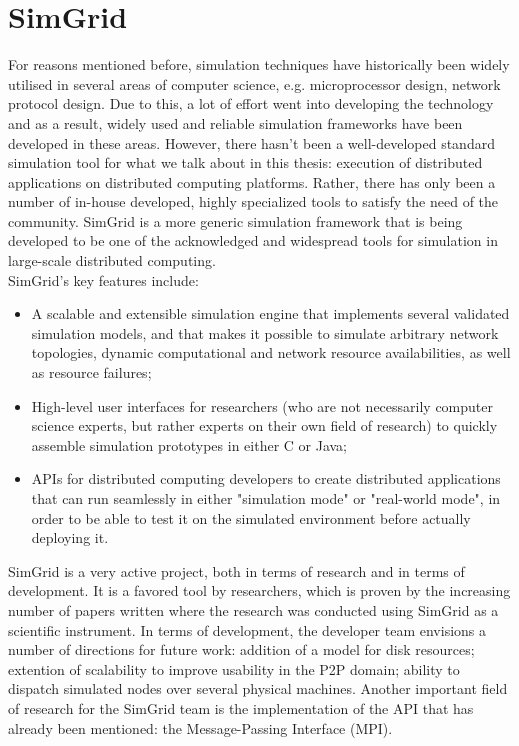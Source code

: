 \section{SimGrid}
For reasons mentioned before, simulation techniques have historically
been widely utilised in several areas of computer science,
e.g. microprocessor design, network protocol design. Due to this, a
lot of effort went into developing the technology and as a result,
widely used and reliable simulation frameworks have been developed in
these areas. However, there hasn't been a well-developed standard
simulation tool for what we talk about in this thesis: execution of
distributed applications on distributed computing platforms. Rather,
there has only been a number of in-house developed, highly specialized
tools to satisfy the need of the community. SimGrid is a more generic
simulation framework that is being developed to be one of the
acknowledged and widespread tools for simulation in large-scale
distributed computing.\cite{clq08}\\[0.3cm]
SimGrid's key features include:\cite{clq08}
\begin{itemize}
\item A scalable and extensible simulation engine that implements
  several validated simulation models, and that makes it possible to
  simulate arbitrary network topologies, dynamic computational and
  network resource availabilities, as well as resource failures;
\item High-level user interfaces for researchers (who are not
  necessarily computer science experts, but rather experts on their own
  field of research) to quickly assemble simulation prototypes in either
  C or Java;
\item APIs for distributed computing developers to create distributed
  applications that can run seamlessly in either "simulation mode" or
  "real-world mode", in order to be able to test it on the simulated
  environment before actually deploying it.
\end{itemize}
SimGrid is a very active project, both in terms of research and in
terms of development. It is a favored tool by researchers, which is
proven by the increasing number of papers written where the research
was conducted using SimGrid as a scientific instrument. In terms of
development, the developer team envisions a number of directions for
future work: addition of a model for disk resources; extention of
scalability to improve usability in the P2P domain; ability to
dispatch simulated nodes over several physical machines.\cite{clq08}
Another important field of research for the SimGrid team is the
implementation of the API that has already been mentioned: the
Message-Passing Interface (MPI).
